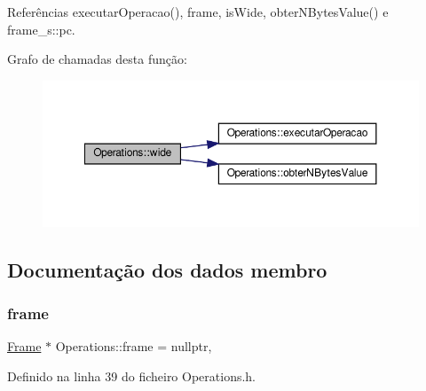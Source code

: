 Referências executar\+Operacao(), frame, is\+Wide, obter\+N\+Bytes\+Value() e frame\+\_\+s\+::pc.

Grafo de chamadas desta função\+:
\nopagebreak
\begin{figure}[H]
\begin{center}
\leavevmode
\includegraphics[width=350pt]{classOperations_ab1474dfc4eb5142361b00d185f0a4a2b_cgraph}
\end{center}
\end{figure}


\subsection{Documentação dos dados membro}
\mbox{\label{classOperations_a0dc7b3710786c9cbd14801ac3e5d34b2}} 
\subsubsection{\texorpdfstring{frame}{frame}}
{\footnotesize\ttfamily \hyperlink{PilhaJVM_8h_acc380914b41a084dcc8e4b38fb200145}{Frame} $\ast$ Operations\+::frame = nullptr\hspace{0.3cm}{\ttfamily [static]}, {\ttfamily [private]}}



Definido na linha 39 do ficheiro Operations.\+h.




